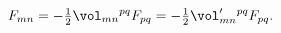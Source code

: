 \begin{equation}
   F_{mn} = - \tfrac{1}{2}\vol_{mn}{}^{pq} F_{pq}
      = - \tfrac{1}{2}\vol'_{mn}{}^{pq} F_{pq} .
\end{equation}

